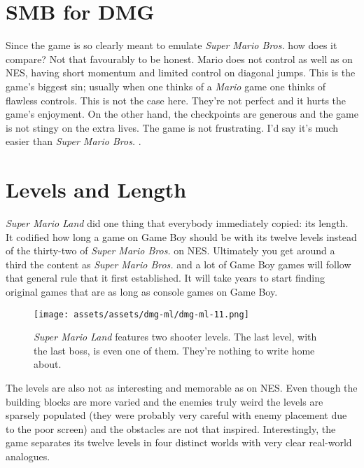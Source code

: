 \documentclass{book}
\begin{document}
\FloatBarrier\needspace{10mm}\section*{SMB for DMG}\nopagebreak[4]

Since the game is so clearly meant to emulate \emph{Super Mario Bros.} how does it compare? Not that favourably to be honest. Mario does not control as well as on NES, having short momentum and limited control on diagonal jumps. This is the game’s biggest sin; usually when one thinks of a \emph{Mario} game one thinks of flawless controls. This is not the case here. They’re not perfect and it hurts the game’s enjoyment. On the other hand, the checkpoints are generous and the game is not stingy on the extra lives. The game is not frustrating. I’d say it’s much easier than \emph{Super Mario Bros.} .

\FloatBarrier\needspace{10mm}\section*{Levels and Length}\nopagebreak[4]

\emph{Super Mario Land} did one thing that everybody immediately copied: its length. It codified how long a game on Game Boy should be with its twelve levels instead of the thirty-two of \emph{Super Mario Bros.} on NES. Ultimately you get around a third the content as \emph{Super Mario Bros.} and a lot of Game Boy games will follow that general rule that it first established. It will take years to start finding original games that are as long as console games on Game Boy.

\begin{figure}[hbt]
\vskip 10pt
\centering \texttt{[image: assets/assets/dmg-ml/dmg-ml-11.png]}\par\pagetwodescription \emph{Super Mario Land} features two shooter levels. The last level, with the last boss, is even one of them. They’re nothing to write home about.
\vskip 6pt
\end{figure}

The levels are also not as interesting and memorable as on NES. Even though the building blocks are more varied and the enemies truly weird the levels are sparsely populated (they were probably very careful with enemy placement due to the poor screen) and the obstacles are not that inspired. Interestingly, the game separates its twelve levels in four distinct worlds with very clear real-world analogues.
\end{document}
